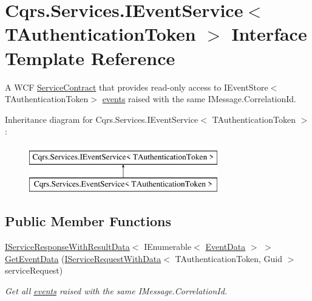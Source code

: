 \hypertarget{interfaceCqrs_1_1Services_1_1IEventService}{}\section{Cqrs.\+Services.\+I\+Event\+Service$<$ T\+Authentication\+Token $>$ Interface Template Reference}
\label{interfaceCqrs_1_1Services_1_1IEventService}


A W\+CF \hyperlink{}{Service\+Contract} that provides read-\/only access to I\+Event\+Store$<$\+T\+Authentication\+Token$>$ \hyperlink{}{events} raised with the same I\+Message.\+Correlation\+Id.  


Inheritance diagram for Cqrs.\+Services.\+I\+Event\+Service$<$ T\+Authentication\+Token $>$\+:\begin{figure}[H]
\begin{center}
\leavevmode
\includegraphics[height=2.000000cm]{interfaceCqrs_1_1Services_1_1IEventService}
\end{center}
\end{figure}
\subsection*{Public Member Functions}
\begin{DoxyCompactItemize}
\item 
\hyperlink{interfaceCqrs_1_1Services_1_1IServiceResponseWithResultData}{I\+Service\+Response\+With\+Result\+Data}$<$ I\+Enumerable$<$ \hyperlink{classCqrs_1_1Events_1_1EventData}{Event\+Data} $>$ $>$ \hyperlink{interfaceCqrs_1_1Services_1_1IEventService_aa41b82bc398bfab0b2fd519d7f067946_aa41b82bc398bfab0b2fd519d7f067946}{Get\+Event\+Data} (\hyperlink{interfaceCqrs_1_1Services_1_1IServiceRequestWithData}{I\+Service\+Request\+With\+Data}$<$ T\+Authentication\+Token, Guid $>$ service\+Request)
\begin{DoxyCompactList}\small\item\em Get all \hyperlink{}{events} raised with the same I\+Message.\+Correlation\+Id. \end{DoxyCompactList}\end{DoxyCompactItemize}


